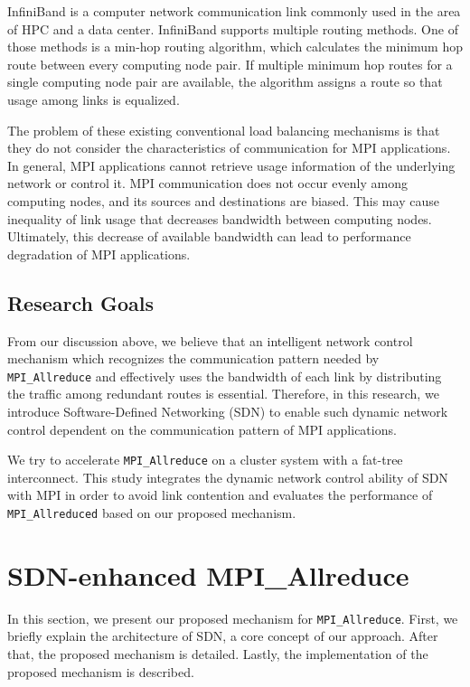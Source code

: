 InfiniBand \cite{infiniband} is a computer network communication link
commonly used in the area of HPC and a data center. InfiniBand supports
multiple routing methods. One of those methods is a min-hop routing
algorithm, which calculates the minimum hop route between every
computing node pair. If multiple minimum hop routes for a single
computing node pair are available, the algorithm assigns a route so that
usage among links is equalized.

The problem of these existing conventional load balancing mechanisms is
that they do not consider the characteristics of communication for MPI
applications. In general, MPI applications cannot retrieve usage
information of the underlying network or control it. MPI communication
does not occur evenly among computing nodes, and its sources and
destinations are biased. This may cause inequality of link usage that
decreases bandwidth between computing nodes. Ultimately, this decrease
of available bandwidth can lead to performance degradation of MPI
applications.

\hypertarget{research-goals}{%
\subsection{Research Goals}\label{research-goals}}

From our discussion above, we believe that an intelligent network
control mechanism which recognizes the communication pattern needed by
\texttt{MPI\_Allreduce} and effectively uses the bandwidth of each link
by distributing the traffic among redundant routes is essential.
Therefore, in this research, we introduce Software-Defined Networking
(SDN) to enable such dynamic network control dependent on the
communication pattern of MPI applications.

We try to accelerate \texttt{MPI\_Allreduce} on a cluster system with a
fat-tree interconnect. This study integrates the dynamic network control
ability of SDN with MPI in order to avoid link contention and evaluates
the performance of \texttt{MPI\_Allreduced} based on our proposed
mechanism.

\hypertarget{sdn-enhanced-mpi_allreduce}{%
\section{SDN-enhanced MPI\_Allreduce}\label{sdn-enhanced-mpi_allreduce}}

In this section, we present our proposed mechanism for
\texttt{MPI\_Allreduce}. First, we briefly explain the architecture of
SDN, a core concept of our approach. After that, the proposed mechanism
is detailed. Lastly, the implementation of the proposed mechanism is
described.

